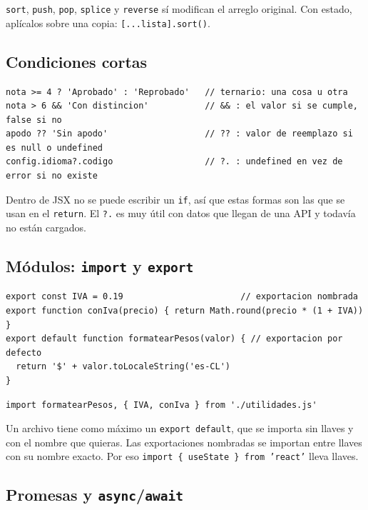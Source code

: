 \documentclass[11pt,a4paper]{article}
\newcommand{\cmd}[1]{\texttt{\color{reactdark}#1}}
\begin{document}
\begin{atencion}
\cmd{sort}, \cmd{push}, \cmd{pop}, \cmd{splice} y \cmd{reverse} sí modifican el arreglo original. Con estado, aplícalos sobre una copia: \cmd{[...lista].sort()}.
\end{atencion}

\subsection{Condiciones cortas}

\begin{lstlisting}[language=JSX]
nota >= 4 ? 'Aprobado' : 'Reprobado'   // ternario: una cosa u otra
nota > 6 && 'Con distincion'           // && : el valor si se cumple, false si no
apodo ?? 'Sin apodo'                   // ?? : valor de reemplazo si es null o undefined
config.idioma?.codigo                  // ?. : undefined en vez de error si no existe
\end{lstlisting}

Dentro de JSX no se puede escribir un \cmd{if}, así que estas formas son las que se usan en el \cmd{return}. El \cmd{?.} es muy útil con datos que llegan de una API y todavía no están cargados.

\subsection{Módulos: \texttt{import} y \texttt{export}}

\begin{lstlisting}[language=JSX,title={\small\ttfamily repaso-js/utilidades.js}]
export const IVA = 0.19                       // exportacion nombrada
export function conIva(precio) { return Math.round(precio * (1 + IVA)) }
export default function formatearPesos(valor) { // exportacion por defecto
  return '$' + valor.toLocaleString('es-CL')
}
\end{lstlisting}
\begin{lstlisting}[language=JSX]
import formatearPesos, { IVA, conIva } from './utilidades.js'
\end{lstlisting}

Un archivo tiene como máximo un \cmd{export default}, que se importa sin llaves y con el nombre que quieras. Las exportaciones nombradas se importan entre llaves con su nombre exacto. Por eso \cmd{import \{ useState \} from 'react'} lleva llaves.

\subsection{Promesas y \texttt{async}/\texttt{await}}
\end{document}
